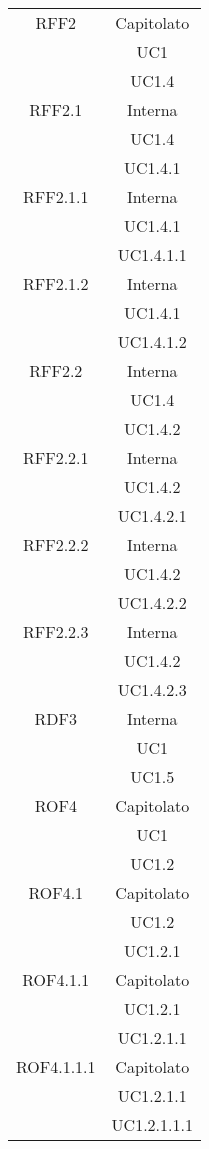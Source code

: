 \begin{longtable}{|c|c|}
\midrule
RFF2
& Capitolato\\
& UC1\\
& UC1.4\\

\midrule
RFF2.1
& Interna\\
& UC1.4\\
& UC1.4.1\\

\midrule
RFF2.1.1
& Interna\\
& UC1.4.1\\
& UC1.4.1.1\\

\midrule
RFF2.1.2
& Interna\\
& UC1.4.1\\
& UC1.4.1.2\\

\midrule
RFF2.2
& Interna\\
& UC1.4\\
& UC1.4.2\\

\midrule
RFF2.2.1
& Interna\\
& UC1.4.2\\
& UC1.4.2.1\\

\midrule
RFF2.2.2
& Interna\\
& UC1.4.2\\
& UC1.4.2.2\\

\midrule
RFF2.2.3
& Interna\\
& UC1.4.2\\
& UC1.4.2.3\\

\midrule
RDF3
& Interna\\
& UC1\\
& UC1.5\\

\midrule
ROF4
& Capitolato\\
& UC1\\
& UC1.2\\

\midrule
ROF4.1
& Capitolato\\
& UC1.2\\
& UC1.2.1\\

\midrule
ROF4.1.1
& Capitolato\\
& UC1.2.1\\
& UC1.2.1.1\\

\midrule
ROF4.1.1.1
& Capitolato\\
& UC1.2.1.1\\
& UC1.2.1.1.1\\


\end{longtable}
